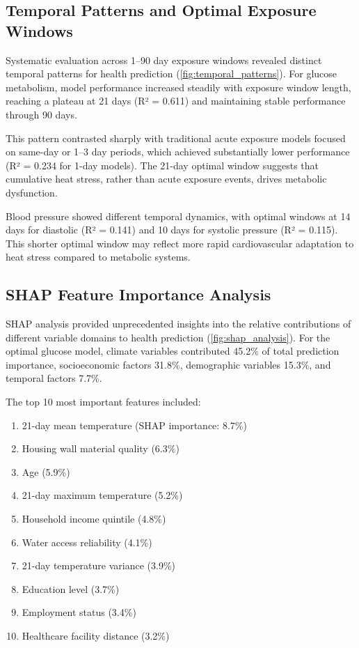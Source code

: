 \documentclass[journal,article,submit,pdftex,moreauthors]{Definitions/mdpi}
\begin{document}
\subsection{Temporal Patterns and Optimal Exposure Windows}

Systematic evaluation across 1--90 day exposure windows revealed distinct temporal patterns for health prediction (\cref{fig:temporal_patterns}). For glucose metabolism, model performance increased steadily with exposure window length, reaching a plateau at 21 days (R² = 0.611) and maintaining stable performance through 90 days.

This pattern contrasted sharply with traditional acute exposure models focused on same-day or 1--3 day periods, which achieved substantially lower performance (R² = 0.234 for 1-day models). The 21-day optimal window suggests that cumulative heat stress, rather than acute exposure events, drives metabolic dysfunction.

Blood pressure showed different temporal dynamics, with optimal windows at 14 days for diastolic (R² = 0.141) and 10 days for systolic pressure (R² = 0.115). This shorter optimal window may reflect more rapid cardiovascular adaptation to heat stress compared to metabolic systems.

\subsection{SHAP Feature Importance Analysis}

SHAP analysis provided unprecedented insights into the relative contributions of different variable domains to health prediction (\cref{fig:shap_analysis}). For the optimal glucose model, climate variables contributed 45.2\% of total prediction importance, socioeconomic factors 31.8\%, demographic variables 15.3\%, and temporal factors 7.7\%.

The top 10 most important features included:
\begin{enumerate}
\item 21-day mean temperature (SHAP importance: 8.7\%)
\item Housing wall material quality (6.3\%)
\item Age (5.9\%)
\item 21-day maximum temperature (5.2\%)
\item Household income quintile (4.8\%)
\item Water access reliability (4.1\%)
\item 21-day temperature variance (3.9\%)
\item Education level (3.7\%)
\item Employment status (3.4\%)
\item Healthcare facility distance (3.2\%)
\end{enumerate}
\end{document}
